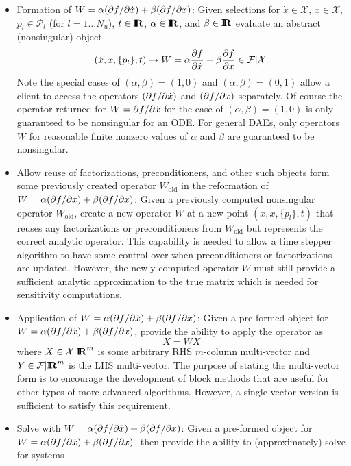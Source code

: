 \documentclass[pdf,ps2pdf,11pt]{SANDreport}
\begin{document}
\begin{itemize}
\begin{itemize}
%
{}\item Formation of $W = {}\alpha (\partial f / \partial \dot{x}) + {}\beta (\partial f / \partial x)$:
Given selections for $\dot{x}\in\mathcal{X}$, $x\in\mathcal{X}$,
$p_l\in\mathcal{P}_l$ (for $l=1\ldots{}N_u$), $t\in\mbox{\textbf{I}}\hspace{-0.6ex}\mbox{\textbf{R}}$, $\alpha\in\mbox{\textbf{I}}\hspace{-0.6ex}\mbox{\textbf{R}}$, and
$\beta\in\mbox{\textbf{I}}\hspace{-0.6ex}\mbox{\textbf{R}}$ evaluate an abstract (nonsingular) object
\[
(\dot{x},x,\{p_l\},t) {}\rightarrow W
= {}\alpha \displaystyle{\frac{\partial f}{\partial {}\dot{x}}} + \beta \displaystyle{\frac{\partial f}{\partial x}}
{}\in {}\mathcal{F}|\mathcal{X}.
\]
Note the special cases of $(\alpha,\beta)=(1,0)$ and $(\alpha,\beta)=(0,1)$
allow a client to access the operators $(\partial f / \partial \dot{x})$ and $(\partial f / \partial x)$
separately.  Of course the operator returned for $W = \partial f / \partial \dot{x}$ for
the case of $(\alpha,\beta)=(1,0)$ is only guaranteed to be nonsingular for an
ODE.  For general DAEs, only operators $W$ for reasonable finite nonzero
values of $\alpha$ and $\beta$ are guaranteed to be nonsingular.
%
{}\item Allow reuse of factorizations, preconditioners, and other such objects
form some previously created operator $W_{\mbox{old}}$ in the reformation of
$W = {}\alpha (\partial f / \partial \dot{x}) + {}\beta (\partial f / \partial x)$: Given a previously
computed nonsingular operator $W_{\mbox{old}}$, create a new operator $W$ at a
new point $(\dot{x},x,\{p_l\},t)$ that reuses any factorizations or
preconditioners from $W_{\mbox{old}}$ but represents the correct analytic
operator.  This capability is needed to allow a time stepper algorithm to have
some control over when preconditioners or factorizations are updated.
However, the newly computed operator $W$ must still provide a sufficient
analytic approximation to the true matrix which is needed for sensitivity
computations.
%
{}\item Application of $W = {}\alpha (\partial f / \partial \dot{x}) + {}\beta
(\partial f / \partial x)$: Given a pre-formed object for $W = {}\alpha (\partial f / \partial \dot{x})
+ {}\beta (\partial f / \partial x)$, provide the ability to apply the operator as
\[
X = W X
\]
where $X\in\mathcal{X}|\mbox{\textbf{I}}\hspace{-0.6ex}\mbox{\textbf{R}}^m$ is some arbitrary RHS $m$-column multi-vector
and $Y\in\mathcal{F}|\mbox{\textbf{I}}\hspace{-0.6ex}\mbox{\textbf{R}}^m$ is the LHS multi-vector.  The purpose of stating
the multi-vector form is to encourage the development of block methods that
are useful for other types of more advanced algorithms.  However, a single
vector version is sufficient to satisfy this requirement.
%
{}\item Solve with $W = {}\alpha (\partial f / \partial \dot{x}) + {}\beta (\partial f / \partial x)$:
Given a pre-formed object for $W = {}\alpha (\partial f / \partial \dot{x}) + {}\beta
(\partial f / \partial x)$, then provide the ability to (approximately) solve for systems

\end{itemize}
\end{itemize}
\end{document}
